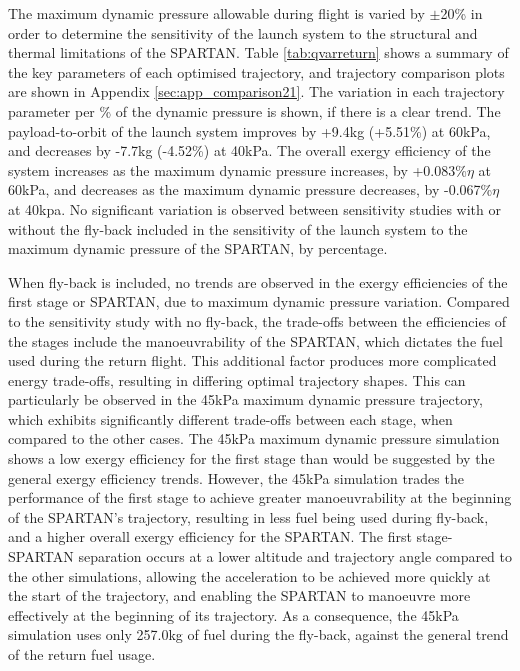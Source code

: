 The maximum dynamic pressure allowable during flight is varied by $\pm$20\% in order to determine the sensitivity of the launch system to the structural and thermal limitations of the SPARTAN.  
Table \ref{tab:qvarreturn} shows a summary of the key parameters of each optimised trajectory, and trajectory comparison plots are shown in Appendix \ref{sec:app_comparison21}. The variation in each trajectory parameter per \% of the dynamic pressure is shown, if there is a clear trend. The payload-to-orbit of the launch system improves by +9.4kg (+5.51\%) at 60kPa, and decreases by -7.7kg (-4.52\%) at 40kPa.
The overall exergy efficiency of the system increases as the maximum dynamic pressure increases, by +0.083\%$\eta$ at 60kPa, and decreases as the maximum dynamic pressure decreases, by -0.067\%$\eta$ at 40kpa. 
No significant variation is observed between sensitivity studies with or without the fly-back included in the sensitivity of the launch system to the maximum dynamic pressure of the SPARTAN, by percentage.

When fly-back is included, no trends are observed in the exergy efficiencies of the first stage or SPARTAN, due to maximum dynamic pressure variation. Compared to the sensitivity study with no fly-back, the trade-offs between the efficiencies of the stages include the manoeuvrability of the SPARTAN, which dictates the fuel used during the return flight. This additional factor produces more complicated energy trade-offs, resulting in differing optimal trajectory shapes. This can particularly be observed in the 45kPa maximum dynamic pressure trajectory, which exhibits significantly different trade-offs between each stage, when compared to the other cases. 
 The 45kPa maximum dynamic pressure simulation shows a low exergy efficiency for the first stage than would be suggested by the general exergy efficiency trends. 
 However, the 45kPa simulation trades the performance of the first stage to achieve greater manoeuvrability at the beginning of the SPARTAN's trajectory, resulting in less fuel being used during fly-back, and a higher overall exergy efficiency for the SPARTAN. The first stage-SPARTAN separation occurs at a lower altitude and trajectory angle compared to the other simulations, allowing the acceleration to be achieved more quickly at the start of the trajectory, and enabling the SPARTAN to manoeuvre more effectively at the beginning of its trajectory. 
 As a consequence, the 45kPa simulation uses only 257.0kg of fuel during the fly-back, against the general trend of the return fuel usage. 

